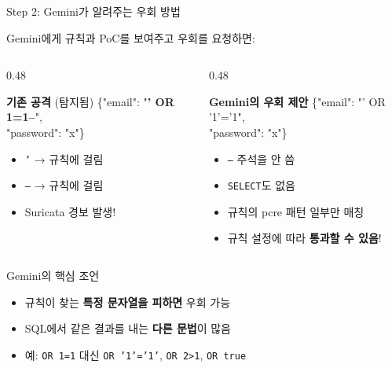 \documentclass[aspectratio=169,10pt]{beamer}
\newcommand{\hlt}[1]{\textcolor{accent}{\textbf{#1}}}
\newcommand{\red}[1]{\textcolor{redTeam}{\textbf{#1}}}
\begin{document}
\begin{frame}[fragile]{Step 2: Gemini가 알려주는 우회 방법}

Gemini에게 규칙과 PoC를 보여주고 우회를 요청하면:

\vspace{0.3em}
\begin{columns}[T]
\begin{column}{0.48\textwidth}
\begin{block}{\red{기존 공격} (탐지됨)}
{\ttfamily\scriptsize
\{"email": "\red{' OR 1=1--}",\\
\quad"password": "x"\}
}
\vspace{0.2em}
\begin{itemize}
    \item \texttt{'} → 규칙에 걸림
    \item \texttt{--} → 규칙에 걸림
    \item Suricata 경보 발생!
\end{itemize}
\end{block}
\end{column}
\begin{column}{0.48\textwidth}
\begin{block}{\textcolor{intGreen}{\textbf{Gemini의 우회 제안}}}
{\ttfamily\scriptsize
\{"email": "\textcolor{intGreen}{' OR '1'='1}",\\
\quad"password": "x"\}
}
\vspace{0.2em}
\begin{itemize}
    \item \texttt{--} 주석을 안 씀
    \item \texttt{SELECT}도 없음
    \item 규칙의 pcre 패턴 일부만 매칭
    \item 규칙 설정에 따라 \hlt{통과할 수 있음}!
\end{itemize}
\end{block}
\end{column}
\end{columns}

\vspace{0.3em}
\begin{alertblock}{Gemini의 핵심 조언}
\begin{itemize}
    \item 규칙이 찾는 \textbf{특정 문자열을 피하면} 우회 가능
    \item SQL에서 같은 결과를 내는 \textbf{다른 문법}이 많음
    \item 예: \texttt{OR 1=1} 대신 \texttt{OR '1'='1'}, \texttt{OR 2>1}, \texttt{OR true}
\end{itemize}
\end{alertblock}
\end{frame}
\end{document}
